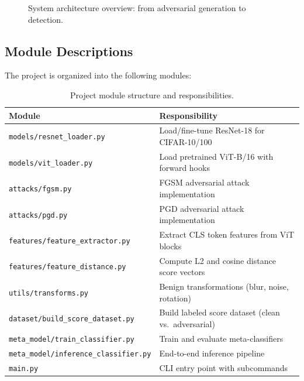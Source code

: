\documentclass[12pt, a4paper]{article}
\begin{document}
\begin{figure}[H]
\caption{System architecture overview: from adversarial generation to detection.}
\label{fig:architecture}
\end{figure}

\subsection{Module Descriptions}

The project is organized into the following modules:

\begin{table}[H]
\centering
\caption{Project module structure and responsibilities.}
\label{tab:modules}
\begin{tabular}{@{}ll@{}}
\toprule
\textbf{Module} & \textbf{Responsibility} \\
\midrule
\texttt{models/resnet\_loader.py} & Load/fine-tune ResNet-18 for CIFAR-10/100 \\
\texttt{models/vit\_loader.py}    & Load pretrained ViT-B/16 with forward hooks \\
\texttt{attacks/fgsm.py}          & FGSM adversarial attack implementation \\
\texttt{attacks/pgd.py}           & PGD adversarial attack implementation \\
\texttt{features/feature\_extractor.py} & Extract CLS token features from ViT blocks \\
\texttt{features/feature\_distance.py}  & Compute L2 and cosine distance score vectors \\
\texttt{utils/transforms.py}      & Benign transformations (blur, noise, rotation) \\
\texttt{dataset/build\_score\_dataset.py} & Build labeled score dataset (clean vs.\ adversarial) \\
\texttt{meta\_model/train\_classifier.py} & Train and evaluate meta-classifiers \\
\texttt{meta\_model/inference\_classifier.py} & End-to-end inference pipeline \\
\texttt{main.py}                   & CLI entry point with subcommands \\
\bottomrule
\end{tabular}
\end{table}
\end{document}
